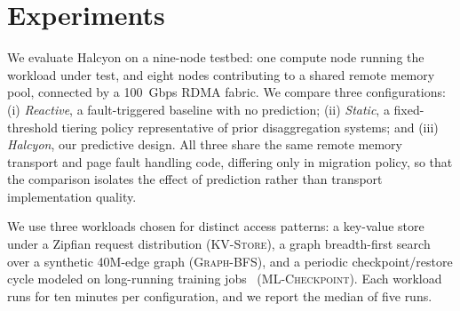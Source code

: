 \section{Experiments}
\label{sec:setup}
We evaluate Halcyon on a nine-node testbed: one compute node running the workload under test, and eight nodes contributing to a shared remote memory pool, connected by a 100~Gbps RDMA fabric. We compare three configurations: (i) \emph{Reactive}, a fault-triggered baseline with no prediction; (ii) \emph{Static}, a fixed-threshold tiering policy representative of prior disaggregation systems; and (iii) \emph{Halcyon}, our predictive design. All three share the same remote memory transport and page fault handling code, differing only in migration policy, so that the comparison isolates the effect of prediction rather than transport implementation quality.

We use three workloads chosen for distinct access patterns: a key-value store under a Zipfian request distribution (\textsc{KV-Store}), a graph breadth-first search over a synthetic 40M-edge graph (\textsc{Graph-BFS}), and a periodic checkpoint/restore cycle modeled on long-running training jobs~\cite{lindqvist2019checkpoint} (\textsc{ML-Checkpoint}). Each workload runs for ten minutes per configuration, and we report the median of five runs.
